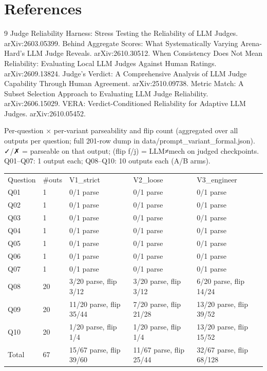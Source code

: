 \documentclass[10pt,twocolumn]{article}
\begin{document}
\section*{References}
\small
\begin{thebibliography}{9}
 Judge Reliability Harness: Stress Testing the Reliability of LLM Judges. arXiv:2603.05399.
 Behind Aggregate Scores: What Systematically Varying Arena-Hard's LLM Judge Reveals. arXiv:2610.30512.
 When Consistency Does Not Mean Reliability: Evaluating Local LLM Judges Against Human Ratings. arXiv:2609.13824.
 Judge's Verdict: A Comprehensive Analysis of LLM Judge Capability Through Human Agreement. arXiv:2510.09738.
 Metric Match: A Subset Selection Approach to Evaluating LLM Judge Reliability. arXiv:2606.15029.
 VERA: Verdict-Conditioned Reliability for Adaptive LLM Judges. arXiv:2610.05452.
\end{thebibliography}
\appendix
Per-question × per-variant parseability and flip count (aggregated over all outputs per question; full 201-row dump in data/prompt\_variant\_formal.json). ✓/✗ = parseable on that output; (flip f/j) = LLM≠mech on judged checkpoints. Q01–Q07: 1 output each; Q08–Q10: 10 outputs each (A/B arms).


\begin{table}[h]
\centering
\begin{tabular}{lllll}
Question & \#outs & V1\_strict & V2\_loose & V3\_engineer \\
Q01 & 1 & 0/1 parse & 0/1 parse & 0/1 parse \\
Q02 & 1 & 0/1 parse & 0/1 parse & 0/1 parse \\
Q03 & 1 & 0/1 parse & 0/1 parse & 0/1 parse \\
Q04 & 1 & 0/1 parse & 0/1 parse & 0/1 parse \\
Q05 & 1 & 0/1 parse & 0/1 parse & 0/1 parse \\
Q06 & 1 & 0/1 parse & 0/1 parse & 0/1 parse \\
Q07 & 1 & 0/1 parse & 0/1 parse & 0/1 parse \\
Q08 & 20 & 3/20 parse, flip 3/12 & 3/20 parse, flip 3/12 & 6/20 parse, flip 14/24 \\
Q09 & 20 & 11/20 parse, flip 35/44 & 7/20 parse, flip 21/28 & 13/20 parse, flip 39/52 \\
Q10 & 20 & 1/20 parse, flip 1/4 & 1/20 parse, flip 1/4 & 13/20 parse, flip 15/52 \\
Total & 67 & 15/67 parse, flip 39/60 & 11/67 parse, flip 25/44 & 32/67 parse, flip 68/128
\end{tabular}
\end{table}
\end{document}
